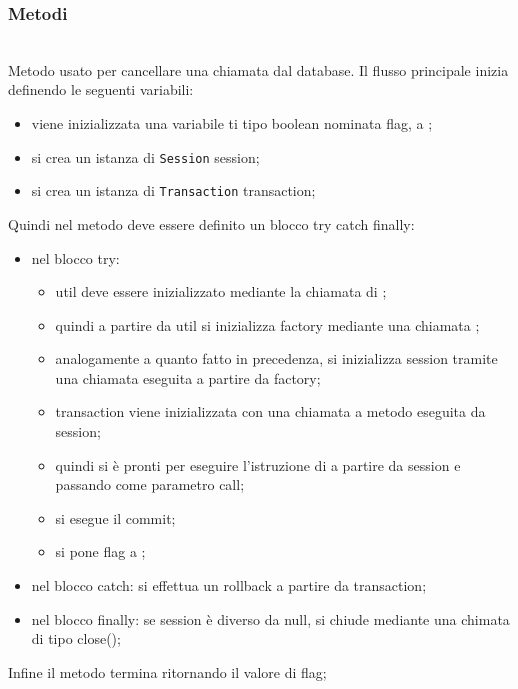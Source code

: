 \subsubsection*{Metodi}

\begin{description}
	\item{}\\
	Metodo usato per cancellare una chiamata dal database. Il flusso principale inizia definendo le seguenti variabili:
	\begin{itemize}
		\item viene inizializzata una variabile ti tipo boolean nominata flag, a ;
		\item si crea un istanza di \texttt{Session} session;
		\item si crea un istanza di \texttt{Transaction} transaction;
	\end{itemize}
	Quindi nel metodo deve essere definito un blocco try catch finally:
	\begin{itemize}
		\item nel blocco try:
		\begin{itemize}
			\item util deve essere inizializzato mediante la chiamata  di ;
			\item quindi a partire da util si inizializza factory mediante una chiamata ;
			\item analogamente a quanto fatto in precedenza, si inizializza session tramite una chiamata  eseguita a partire da factory;
			\item transaction viene inizializzata con una chiamata a metodo  eseguita da session;
			\item quindi si è pronti per eseguire l'istruzione di  a partire da session e passando come parametro call;
			\item si esegue il commit;
			\item si pone flag a ;
		\end{itemize}
		\item nel blocco catch: si effettua un rollback a partire da transaction;
		\item nel blocco finally: se session è diverso da null, si chiude mediante una chimata di tipo close();
	\end{itemize}
	Infine il metodo termina ritornando il valore di flag;
	

\end{description}
